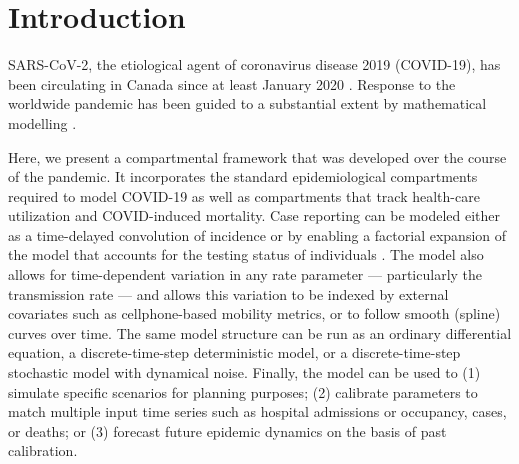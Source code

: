 \documentclass[12pt]{article}\usepackage[]{graphicx}\usepackage[]{color}
\begin{document}
\tableofcontents




\section{Introduction}

SARS-CoV-2, the etiological agent of coronavirus disease 2019 (COVID-19), has been circulating in Canada since at least January 2020 \cite{onpr_200125}.
Response to the worldwide pandemic \cite{Li+20,Fauc+20} has been guided to a substantial extent by mathematical modelling \cite{Flax+20}.


Here, we present a compartmental framework that was developed over the course of the pandemic. 
It incorporates the standard epidemiological compartments required to model COVID-19 as well as compartments that track health-care utilization and COVID-induced
mortality. 
Case reporting can be modeled either as a time-delayed convolution of incidence or by enabling a factorial expansion of the model that accounts for the testing status of individuals \cite{Fris+20}. 
The model also allows for time-dependent variation in any rate parameter --- particularly the transmission rate --- and allows this variation to be indexed by external covariates such as cellphone-based mobility metrics, or to follow smooth (spline) curves over time. 
The same model structure can be run as an ordinary differential equation, a discrete-time-step deterministic model, or a discrete-time-step stochastic model with dynamical noise.
Finally, the model can be used to
(1) simulate specific scenarios for planning purposes;
(2) calibrate parameters to match multiple input time series such as hospital admissions or occupancy, cases, or deaths; or
(3) forecast future epidemic dynamics on the basis of past calibration.
\end{document}
